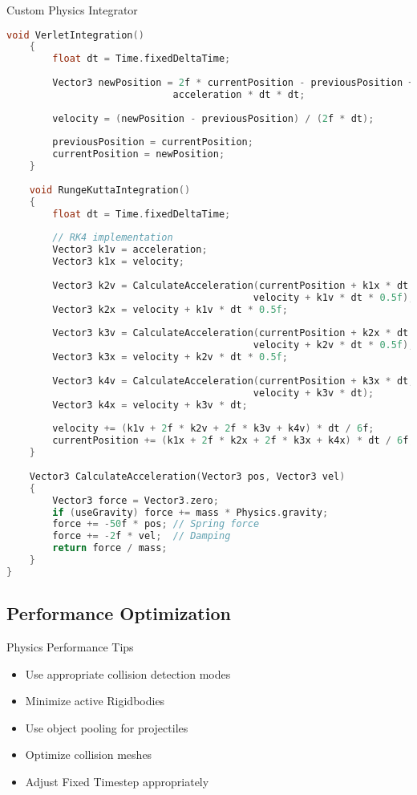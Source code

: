 \begin{code}{Custom Physics Integrator}
\begin{lstlisting}[language=C, style=basesmol]
    void VerletIntegration() 
    {
        float dt = Time.fixedDeltaTime;
        
        Vector3 newPosition = 2f * currentPosition - previousPosition + 
                             acceleration * dt * dt;
        
        velocity = (newPosition - previousPosition) / (2f * dt);
        
        previousPosition = currentPosition;
        currentPosition = newPosition;
    }
    
    void RungeKuttaIntegration() 
    {
        float dt = Time.fixedDeltaTime;
        
        // RK4 implementation
        Vector3 k1v = acceleration;
        Vector3 k1x = velocity;
        
        Vector3 k2v = CalculateAcceleration(currentPosition + k1x * dt * 0.5f, 
                                           velocity + k1v * dt * 0.5f);
        Vector3 k2x = velocity + k1v * dt * 0.5f;
        
        Vector3 k3v = CalculateAcceleration(currentPosition + k2x * dt * 0.5f, 
                                           velocity + k2v * dt * 0.5f);
        Vector3 k3x = velocity + k2v * dt * 0.5f;
        
        Vector3 k4v = CalculateAcceleration(currentPosition + k3x * dt, 
                                           velocity + k3v * dt);
        Vector3 k4x = velocity + k3v * dt;
        
        velocity += (k1v + 2f * k2v + 2f * k3v + k4v) * dt / 6f;
        currentPosition += (k1x + 2f * k2x + 2f * k3x + k4x) * dt / 6f;
    }
    
    Vector3 CalculateAcceleration(Vector3 pos, Vector3 vel) 
    {
        Vector3 force = Vector3.zero;
        if (useGravity) force += mass * Physics.gravity;
        force += -50f * pos; // Spring force
        force += -2f * vel;  // Damping
        return force / mass;
    }
}
\end{lstlisting}
\end{code}

\subsection{Performance Optimization}

\begin{concept}{Physics Performance Tips}\\
    \begin{itemize}
        \item Use appropriate collision detection modes
        \item Minimize active Rigidbodies
        \item Use object pooling for projectiles
        \item Optimize collision meshes
        \item Adjust Fixed Timestep appropriately
    \end{itemize}
\end{concept}

